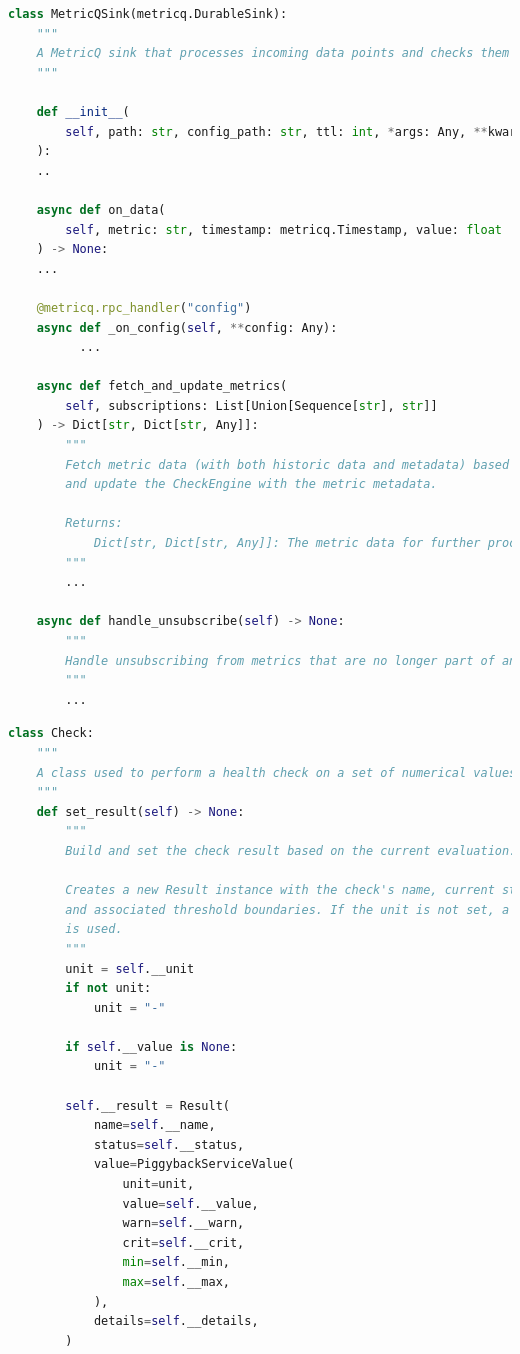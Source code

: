\begin{lstlisting}[language=Python, caption=MetricQSink-Klasse, label=lst:metricq_sink]
class MetricQSink(metricq.DurableSink):
    """
    A MetricQ sink that processes incoming data points and checks them using CheckEngine.
    """

    def __init__(
        self, path: str, config_path: str, ttl: int, *args: Any, **kwargs: Any
    ):
    ..

    async def on_data(
        self, metric: str, timestamp: metricq.Timestamp, value: float
    ) -> None:
    ...

    @metricq.rpc_handler("config")
    async def _on_config(self, **config: Any):
          ...

    async def fetch_and_update_metrics(
        self, subscriptions: List[Union[Sequence[str], str]]
    ) -> Dict[str, Dict[str, Any]]:
        """
        Fetch metric data (with both historic data and metadata) based on subscriptions,
        and update the CheckEngine with the metric metadata.

        Returns:
            Dict[str, Dict[str, Any]]: The metric data for further processing.
        """
        ...

    async def handle_unsubscribe(self) -> None:
        """
        Handle unsubscribing from metrics that are no longer part of any active check.
        """
        ...
\end{lstlisting}

\begin{lstlisting}[language=Python, caption=CheckEngine-Klasse, label=lst:check_engine]
class Check:
    """
    A class used to perform a health check on a set of numerical values.
    """
    def set_result(self) -> None:
        """
        Build and set the check result based on the current evaluation.

        Creates a new Result instance with the check's name, current status, average value,
        and associated threshold boundaries. If the unit is not set, a default placeholder ("-")
        is used.
        """
        unit = self.__unit
        if not unit:
            unit = "-"

        if self.__value is None:
            unit = "-"

        self.__result = Result(
            name=self.__name,
            status=self.__status,
            value=PiggybackServiceValue(
                unit=unit,
                value=self.__value,
                warn=self.__warn,
                crit=self.__crit,
                min=self.__min,
                max=self.__max,
            ),
            details=self.__details,
        )
\end{lstlisting}

